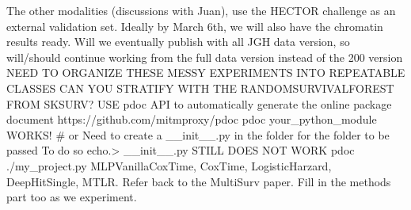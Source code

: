 \documentclass{article}%
\begin{document}
\newline%
\newline%
%
The other modalities (discussions with Juan), use the HECTOR challenge as an external validation set. %
\newline%
\newline%
%
Ideally by March 6th, we will also have the chromatin results ready. %
\newline%
\newline%
%
Will we eventually publish with all JGH data version, so will/should continue working from the full data version instead of the 200 version %
\newline%
\newline%
%
NEED TO ORGANIZE THESE MESSY EXPERIMENTS INTO REPEATABLE CLASSES %
\newline%
\newline%
%
CAN YOU STRATIFY WITH THE RANDOMSURVIVALFOREST FROM SKSURV? %
\newline%
\newline%
%
USE pdoc API to automatically generate the online package document %
\newline%
\newline%
%
https://github.com/mitmproxy/pdoc%
\newline%
\newline%
%
pdoc your\_python\_module%
\newline%
\newline%
%
WORKS! %
\newline%
\newline%
%
\# or%
\newline%
\newline%
%
Need to create a \_\_init\_\_.py in the folder for the folder to be passed %
\newline%
\newline%
%
To do so%
\newline%
\newline%
%
echo.> \_\_init\_\_.py %
\newline%
\newline%
%
STILL DOES NOT WORK%
\newline%
\newline%
%
pdoc ./my\_project.py%
\newline%
\newline%
%
MLPVanillaCoxTime, CoxTime, LogisticHarzard, DeepHitSingle, MTLR. Refer back to the MultiSurv paper. %
\newline%
\newline%
%
Fill in the methods part too as we experiment. %
\end{document}
